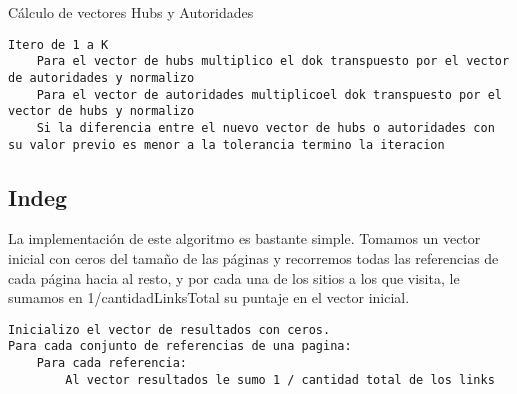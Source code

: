 Cálculo de vectores Hubs y Autoridades
\begin{lstlisting}[frame=single] 
Itero de 1 a K
	Para el vector de hubs multiplico el dok transpuesto por el vector de autoridades y normalizo
	Para el vector de autoridades multiplicoel dok transpuesto por el vector de hubs y normalizo
	Si la diferencia entre el nuevo vector de hubs o autoridades con su valor previo es menor a la tolerancia termino la iteracion
\end{lstlisting}

\subsection{Indeg}

La implementación de este algoritmo es bastante simple. Tomamos un vector inicial con ceros del tamaño de las páginas y recorremos todas las referencias de cada página hacia al resto, y por cada una de los sitios a los que visita, le sumamos en 1/cantidadLinksTotal su puntaje en el vector inicial.

\begin{lstlisting}[frame=single] 
Inicializo el vector de resultados con ceros.
Para cada conjunto de referencias de una pagina:
	Para cada referencia:
		Al vector resultados le sumo 1 / cantidad total de los links
	
\end{lstlisting}